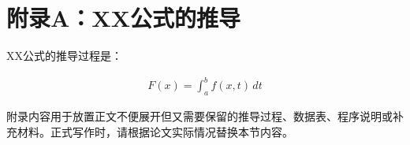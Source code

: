 
\section*{附录A：XX公式的推导}
\thesisbodyfont

XX公式的推导过程是：

\begin{eqnarray}
F(x) = \int_a^b f(x,t)\,dt
\end{eqnarray}

附录内容用于放置正文不便展开但又需要保留的推导过程、数据表、程序说明或补充材料。正式写作时，请根据论文实际情况替换本节内容。
